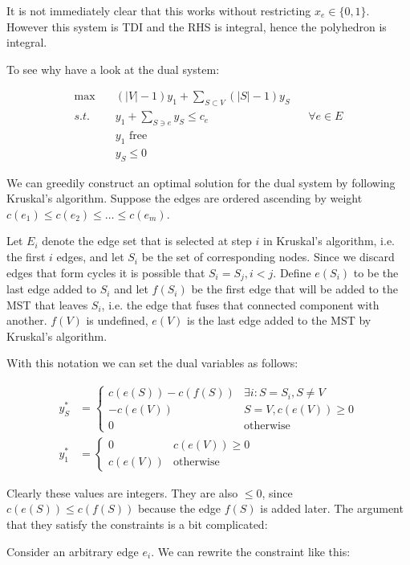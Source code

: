 It is not immediately clear that this works without restricting $x_e\in \{0,1\}$. However this system is TDI and the RHS is integral, hence the polyhedron is integral.

To see why have a look at the dual system:

\begin{align*}
\max \quad & (|V|-1)y_1 + \sum_{S\subset V} (|S|-1)y_S\\
s.t. \quad & y_1 + \sum_{S\ni e} y_S \leq c_e && \forall e\in E\\ 
	& y_1 \text{ free}\\
	& y_S \leq 0
\end{align*}

We can greedily construct an optimal solution for the dual system by following Kruskal's algorithm. Suppose the edges are ordered ascending by weight $c(e_1)\leq c(e_2)\leq \ldots \leq c(e_m)$. 

Let $E_i$ denote the edge set that is selected at step $i$ in Kruskal's algorithm, i.e. the first $i$ edges, and let $S_i$ be the set of corresponding nodes. Since we discard edges that form cycles it is possible that $S_i=S_j, i<j$. Define $e(S_i)$ to be the last edge added to $S_i$ and let $f(S_i)$ be the first edge that will be added to the MST that leaves $S_i$, i.e. the edge that fuses that connected component with another. $f(V)$ is undefined, $e(V)$ is the last edge added to the MST by Kruskal's algorithm.

With this notation we can set the dual variables as follows:

\begin{align*}
y_S^* &= \begin{cases}
c(e(S)) - c(f(S)) & \exists i: S=S_i, S\neq V\\
-c(e(V)) 	& S=V, c(e(V)) \geq 0\\
0	& \text{otherwise}\end{cases}\\
y_1^* &= \begin{cases}
0 & c(e(V)) \geq 0\\
c(e(V)) & \text{otherwise}
\end{cases}
\end{align*}

Clearly these values are integers. They are also $\leq 0$, since $c(e(S)) \leq c(f(S))$ because the edge $f(S)$ is added later. The argument that they satisfy the constraints is a bit complicated:

Consider an arbitrary edge $e_i$. We can rewrite the constraint like this:

